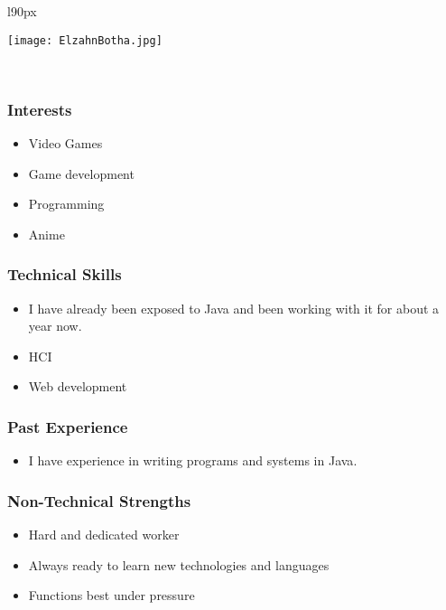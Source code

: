 \begin{wrapfigure}[6]{l}{90px}

\texttt{[image: ElzahnBotha.jpg]}
\end{wrapfigure}

\textcolor{white}{.}
\subsubsection{Interests}
\begin{itemize}
	\item{Video Games}
	\item{Game development}
	\item{Programming}
	\item{Anime}
\end{itemize}
\subsubsection{Technical Skills} 
\begin{itemize}
	\item{I have already been exposed to Java and been working with it for about a year now}.
	\item{HCI}
	\item{Web development}
\end{itemize}
\subsubsection{Past Experience}
\begin{itemize}
	\item{I have experience in writing programs and systems in Java}.
\end{itemize}
\subsubsection{Non-Technical Strengths} 
\begin{itemize}
	\item{Hard and dedicated worker}
	\item{Always ready to learn new technologies and languages}
	\item{Functions best under pressure}
\end{itemize}